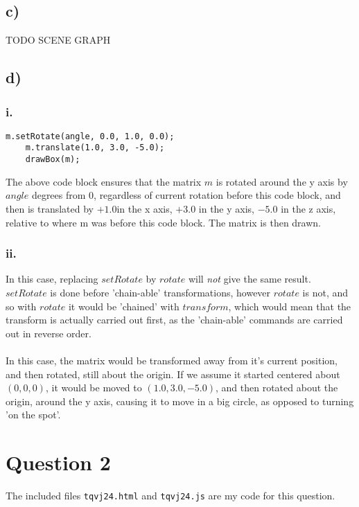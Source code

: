 \documentclass[a4paper,12pt]{article}
\begin{document}
\subsection*{c)}
TODO SCENE GRAPH

\subsection*{d)}
\subsubsection*{i.}
\begin{lstlisting}[caption=Explaining the meaning]
    m.setRotate(angle, 0.0, 1.0, 0.0);
    m.translate(1.0, 3.0, -5.0);
    drawBox(m);
\end{lstlisting}
The above code block ensures that the matrix $m$ is rotated around the y axis by $angle$ degrees from $0$, regardless of current rotation before this code block, and then is translated by $+1.0$in the x axis, $+3.0$ in the y axis, $-5.0$ in the z axis, relative to where m was before this code block. The matrix is then drawn.\\
\subsubsection*{ii.}
In this case, replacing $setRotate$ by $rotate$ will \textit{not} give the same result. $setRotate$ is done before 'chain-able' transformations, however $rotate$ is not, and so with $rotate$ it would be 'chained' with $transform$, which would mean that the transform is actually carried out first, as the 'chain-able' commands are carried out in reverse order.\\\\In this case, the matrix would be transformed away from it's current position, and then rotated, still about the origin. If we assume it started centered about $(0,0,0)$, it would be moved to $(1.0, 3.0, -5.0)$, and then rotated about the origin, around the y axis, causing it to move in a big circle, as opposed to turning 'on the spot'.

\section*{Question 2}
The included files \texttt{tqvj24.html} and \texttt{tqvj24.js} are my code for this question.
\end{document}
